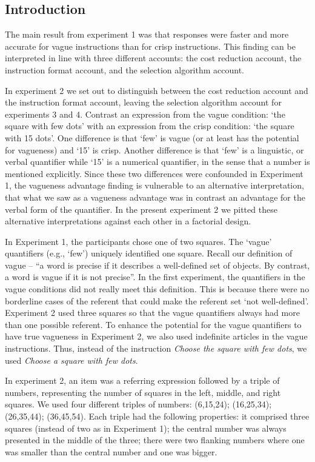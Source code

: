 \subsection{Introduction}

The main result from experiment 1 was that responses were faster and more accurate for vague instructions than for crisp instructions. This finding can be interpreted in line with three different accounts: the cost reduction account, the instruction format account, and the selection algorithm account. 

In experiment 2 we set out to distinguish between the cost reduction account and the instruction format account, leaving the selection algorithm account for experiments 3 and 4. Contrast an expression from the vague condition: `the square with few dots' with an expression from the crisp condition: `the square with 15 dots'. One difference is that `few' is vague (or at least has the potential for vagueness) and `15' is crisp. Another difference is that `few' is a linguistic, or verbal quantifier while `15' is a numerical quantifier, in the sense that a number is mentioned explicitly. Since these two differences were confounded in Experiment 1, the vagueness advantage finding is vulnerable to an alternative interpretation, that what we saw as a vagueness advantage was in contrast an advantage for the verbal form of the quantifier. In the present experiment 2 we pitted these alternative interpretations against each other in a factorial design. 

In Experiment 1, the participants chose one of two squares. The `vague' quantifiers (e.g., `few') uniquely identified one square. Recall our definition of vague  -- ``a word is precise if it describes a well-defined set of objects. By contrast, a word is vague if it is not precise''.  In the first experiment, the quantifiers in the vague conditions did not really meet this definition. This is because there were no borderline cases of the referent that could make the referent set `not well-defined'. Experiment 2 used three squares so that the vague quantifiers always had more than one possible referent. To enhance the potential for the vague quantifiers to have true vagueness in Experiment 2, we also used indefinite articles in the vague instructions. Thus, instead of the instruction \emph{Choose the square with few dots}, we used \emph{Choose a square with few dots}.

In experiment 2, an item was a referring expression followed by a triple of numbers, representing the number of squares in the left, middle, and right squares. We used four different triples of numbers: (6,15,24); (16,25,34); (26,35,44); (36,45,54). Each triple had the following properties: it comprised three squares (instead of two as in Experiment 1); the central number was always presented in the middle of the three; there were two flanking numbers where one was smaller than the central number and one was bigger. 

